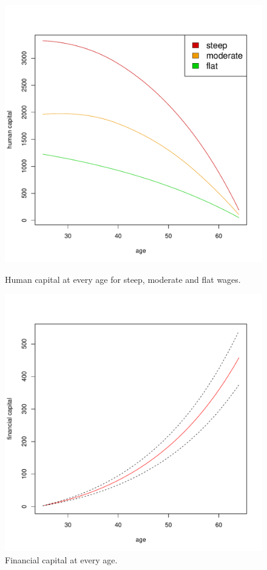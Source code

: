 \begin{figure}[h!]
	\centering
    \begin{minipage}{0.45\textwidth}
		\centering
		\includegraphics[scale=0.4]{figs/humancapital.pdf}
		\caption{Human capital at every age for steep, moderate and flat wages.}
		\label{fig:humcap}
	\end{minipage}
	\hfill
    \begin{minipage}{0.45\textwidth}
		\centering
		\includegraphics[scale=0.4]{figs/fincapital.pdf}
		\caption{Financial capital at every age.}
		\label{fig:fincap}
	\end{minipage}
\end{figure}

